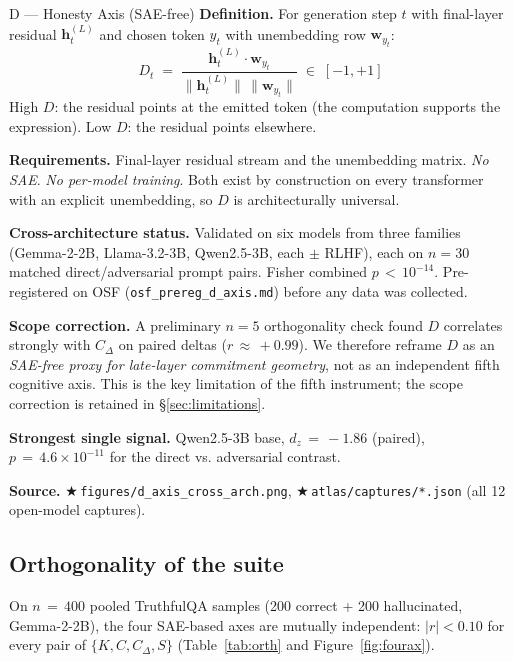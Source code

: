 \documentclass[11pt,letterpaper]{article}
\newcommand{\repro}[1]{%
  \textcolor{fathomgreen}{\footnotesize$\bigstar$\,\texttt{#1}}}
\begin{document}
\begin{mcard}{D --- Honesty Axis (SAE-free)}
\textbf{Definition.} For generation step $t$ with final-layer residual
$\mathbf{h}_t^{(L)}$ and chosen token $y_t$ with unembedding row
$\mathbf{w}_{y_t}$:
\[
D_t \;=\; \frac{\mathbf{h}_t^{(L)}\cdot\mathbf{w}_{y_t}}
                {\|\mathbf{h}_t^{(L)}\|\,\|\mathbf{w}_{y_t}\|}
\;\in\;[-1,+1]
\]
High $D$: the residual points at the emitted token (the computation
supports the expression). Low $D$: the residual points elsewhere.
\vspace{2pt}

\textbf{Requirements.} Final-layer residual stream and the unembedding
matrix. \emph{No SAE}. \emph{No per-model training}. Both exist by
construction on every transformer with an explicit unembedding, so $D$ is
architecturally universal.
\vspace{2pt}

\textbf{Cross-architecture status.} Validated on six models from three
families (Gemma-2-2B, Llama-3.2-3B, Qwen2.5-3B, each $\pm$ RLHF), each on
$n\!=\!30$ matched direct/adversarial prompt pairs. Fisher combined $p
\,<\,10^{-14}$. Pre-registered on OSF (\texttt{osf\_prereg\_d\_axis.md})
before any data was collected.
\vspace{2pt}

\textbf{Scope correction.} A preliminary $n\!=\!5$ orthogonality check
found $D$ correlates strongly with $C_\Delta$ on paired deltas
($r\,\approx\,+0.99$). We therefore reframe $D$ as an \emph{SAE-free proxy
for late-layer commitment geometry}, not as an independent fifth cognitive
axis. This is the key limitation of the fifth instrument; the scope
correction is retained in \S\ref{sec:limitations}.
\vspace{2pt}

\textbf{Strongest single signal.} Qwen2.5-3B base, $d_z\,=\,-1.86$
(paired), $p\,=\,4.6\!\times\!10^{-11}$ for the direct vs. adversarial
contrast.
\vspace{2pt}

\textbf{Source.} \repro{figures/d\_axis\_cross\_arch.png},
\repro{atlas/captures/*.json} (all 12 open-model captures).
\end{mcard}

\subsection{Orthogonality of the suite}
\label{sec:orthogonality}

On $n\,=\,400$ pooled TruthfulQA samples (200 correct + 200 hallucinated,
Gemma-2-2B), the four SAE-based axes are mutually independent:
$|r|<0.10$ for every pair of $\{K,C,C_\Delta,S\}$
(Table~\ref{tab:orth} and Figure~\ref{fig:fourax}).
\end{document}
